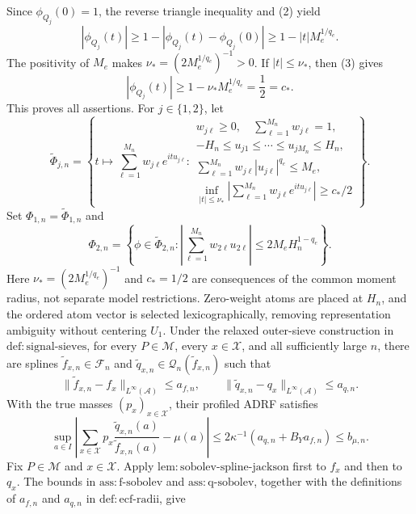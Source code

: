 Since \(\phi_{Q_j}(0)=1\), the reverse triangle inequality and (2) yield
\[
 |\phi_{Q_j}(t)|
 \ge1-|\phi_{Q_j}(t)-\phi_{Q_j}(0)|
 \ge1-|t|M_e^{1/q_e}.                                              \tag{3}
\]
The positivity of \(M_e\) makes
\(\nu_*=(2M_e^{1/q_e})^{-1}>0\).  If \(|t|\le\nu_*\), then (3) gives
\[
 |\phi_{Q_j}(t)|\ge1-\nu_*M_e^{1/q_e}=\frac12=c_*.
\]
This proves all assertions.
For \(j\in\{1,2\}\), let
\[
 \widetilde\Phi_{j,n}
 =\left\{
 t\longmapsto\sum_{\ell=1}^{M_n}w_{j\ell}e^{itu_{j\ell}}:
 \begin{array}{l}
 w_{j\ell}\ge0,\quad \sum_{\ell=1}^{M_n}w_{j\ell}=1,\\
 -H_n\le u_{j1}\le\cdots\le u_{jM_n}\le H_n,\\
 \sum_{\ell=1}^{M_n}w_{j\ell}|u_{j\ell}|^{q_e}\le M_e,\\
 \displaystyle
 \inf_{|t|\le\nu_*}
 \left|\sum_{\ell=1}^{M_n}w_{j\ell}e^{itu_{j\ell}}\right|
 \ge c_*/2
 \end{array}
 \right\}.
\]
Set \(\Phi_{1,n}=\widetilde\Phi_{1,n}\) and
\[
 \Phi_{2,n}
 =\left\{\phi\in\widetilde\Phi_{2,n}:
 \left|\sum_{\ell=1}^{M_n}w_{2\ell}u_{2\ell}\right|
 \le2M_eH_n^{1-q_e}\right\}.
\]
Here \(\nu_*=(2M_e^{1/q_e})^{-1}\) and \(c_*=1/2\) are consequences of
the common moment radius, not separate model restrictions.  Zero-weight
atoms are placed at \(H_n\), and the ordered atom vector is selected
lexicographically, removing representation ambiguity without centering
\(U_1\).
Under the relaxed outer-sieve construction in
\(\mathrm{def{:}signal\text{-}sieves}\), for every \(P\in\mathcal M\),
every \(x\in\mathcal X\), and all sufficiently large \(n\), there are
splines \(\widetilde f_{x,n}\in\mathscr F_n\) and
\(\widetilde q_{x,n}\in\mathscr Q_n(\widetilde f_{x,n})\) such that
\[
 \|\widetilde f_{x,n}-f_x\|_{L^\infty(\mathcal A)}\le a_{f,n},
 \qquad
 \|\widetilde q_{x,n}-q_x\|_{L^\infty(\mathcal A)}\le a_{q,n}.
\]
With the true masses \((p_x)_{x\in\mathcal X}\), their profiled ADRF
satisfies
\[
 \sup_{a\in I}\left|
 \sum_{x\in\mathcal X}p_x
 \frac{\widetilde q_{x,n}(a)}{\widetilde f_{x,n}(a)}-\mu(a)
 \right|
 \le2\kappa^{-1}(a_{q,n}+B_Ya_{f,n})
 \le b_{\mu,n}.
\]
Fix \(P\in\mathcal M\) and \(x\in\mathcal X\).  Apply
\(\mathrm{lem{:}sobolev\text{-}spline\text{-}jackson}\) first to \(f_x\)
and then to \(q_x\).  The bounds in \(\mathrm{ass{:}f\text{-}sobolev}\)
and \(\mathrm{ass{:}q\text{-}sobolev}\), together with the definitions of
\(a_{f,n}\) and \(a_{q,n}\) in \(\mathrm{def{:}ecf\text{-}radii}\), give
